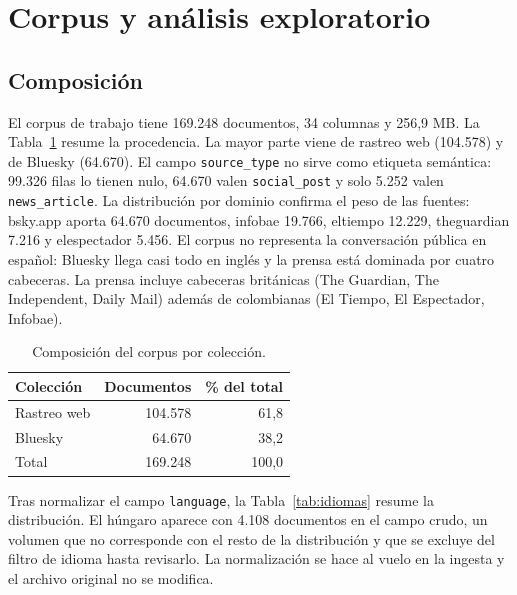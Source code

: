 \section{Corpus y an\'alisis exploratorio}
\label{sec:corpus}

\subsection{Composici\'on}

El corpus de trabajo tiene 169.248 documentos, 34 columnas y 256,9 MB. La Tabla~\ref{tab:composicion} resume la procedencia. La mayor parte viene de rastreo web (104.578) y de Bluesky (64.670). El campo \texttt{source\_type} no sirve como etiqueta sem\'antica: 99.326 filas lo tienen nulo, 64.670 valen \texttt{social\_post} y solo 5.252 valen \texttt{news\_article}. La distribuci\'on por dominio confirma el peso de las fuentes: bsky.app aporta 64.670 documentos, infobae 19.766, eltiempo 12.229, theguardian 7.216 y elespectador 5.456. El corpus no representa la conversaci\'on p\'ublica en espa\~nol: Bluesky llega casi todo en ingl\'es y la prensa est\'a dominada por cuatro cabeceras. La prensa incluye cabeceras brit\'anicas (The Guardian, The Independent, Daily Mail) adem\'as de colombianas (El Tiempo, El Espectador, Infobae).

\begin{table}[t]
\centering
\caption{Composici\'on del corpus por colecci\'on.}
\label{tab:composicion}
\begin{tabular}{lrr}
\toprule
Colecci\'on & Documentos & \% del total \\
\midrule
Rastreo web & 104.578 & 61,8 \\
Bluesky & 64.670 & 38,2 \\
\midrule
Total & 169.248 & 100,0 \\
\bottomrule
\end{tabular}
\end{table}

Tras normalizar el campo \texttt{language}, la Tabla~\ref{tab:idiomas} resume la distribuci\'on. El h\'ungaro aparece con 4.108 documentos en el campo crudo, un volumen que no corresponde con el resto de la distribuci\'on y que se excluye del filtro de idioma hasta revisarlo. La normalizaci\'on se hace al vuelo en la ingesta y el archivo original no se modifica.

